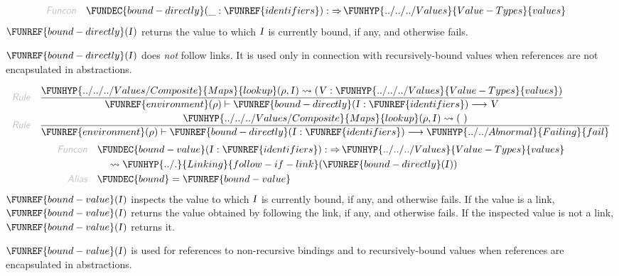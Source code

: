 \begin{align*}
  \KEY{Funcon} \quad
  & \FUNDEC{bound-directly}(
                       \_ : \FUNREF{identifiers}) 
    :  \TO \FUNHYP{../../../Values}{Value-Types}{values} 
\end{align*}
$\FUNREF{bound-directly}
    (  \VAR{I} )$ returns the value to which $\VAR{I}$ is currently bound, if any,
  and otherwise fails.

$\FUNREF{bound-directly}
    (  \VAR{I} )$ does \emph{not} follow links. It is used only in connection with
  recursively-bound values when references are not encapsulated in abstractions.

\begin{align*}
  \KEY{Rule} \quad
    & \frac{
      \FUNHYP{../../../Values/Composite}{Maps}{lookup}
        (  \VAR{\ensuremath{\rho}}, 
               \VAR{I} ) \leadsto 
        (  \VAR{V} : \FUNHYP{../../../Values}{Value-Types}{values} )
      }{
      \FUNREF{environment} (  \VAR{\ensuremath{\rho}} ) \vdash \FUNREF{bound-directly}
                    (  \VAR{I} : \FUNREF{identifiers} ) \TRANS 
        \VAR{V}
      }
\\
  \KEY{Rule} \quad
    & \frac{
      \FUNHYP{../../../Values/Composite}{Maps}{lookup}
        (  \VAR{\ensuremath{\rho}}, 
               \VAR{I} ) \leadsto 
        (   \  )
      }{
      \FUNREF{environment} (  \VAR{\ensuremath{\rho}} ) \vdash \FUNREF{bound-directly}
                    (  \VAR{I} : \FUNREF{identifiers} ) \TRANS 
        \FUNHYP{../../Abnormal}{Failing}{fail}
      }
\end{align*}
\begin{align*}
  \KEY{Funcon} \quad
  & \FUNDEC{bound-value}(
                       \VAR{I} : \FUNREF{identifiers}) 
    :  \TO \FUNHYP{../../../Values}{Value-Types}{values} \\&\quad
    \leadsto \FUNHYP{../.}{Linking}{follow-if-link}
               (  \FUNREF{bound-directly}
                       (  \VAR{I} ) )
\\
  \KEY{Alias} \quad
  & \FUNDEC{bound} = \FUNREF{bound-value}
\end{align*}
$\FUNREF{bound-value}
    (  \VAR{I} )$ inspects the value to which $\VAR{I}$ is currently bound, if any,
   and otherwise fails. If the value is a link, $\FUNREF{bound-value}
    (  \VAR{I} )$ returns the
   value obtained by following the link, if any, and otherwise fails. If the 
   inspected value is not a link, $\FUNREF{bound-value}
    (  \VAR{I} )$ returns it.

$\FUNREF{bound-value}
    (  \VAR{I} )$ is used for references to non-recursive bindings and to
   recursively-bound values when references are encapsulated in abstractions.

